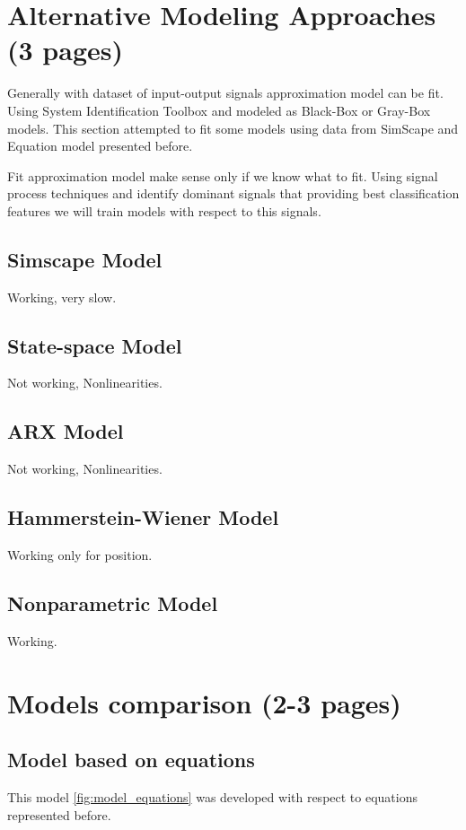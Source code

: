 \documentclass[class=article, crop=false]{standalone}
\begin{document}
\section{Alternative Modeling Approaches (3 pages)}
Generally with dataset of input-output signals approximation model can be
fit. Using System Identification Toolbox and modeled as Black-Box or
Gray-Box models. This section attempted to fit some models using data from
SimScape and Equation model presented before.

Fit approximation model make sense only if we know what to fit. Using
signal process techniques and identify dominant signals that providing best
classification features we will train models with respect to this signals.


\subsection{Simscape Model}
Working, very slow.


\subsection{State-space Model}
Not working, Nonlinearities.

\subsection{ARX Model}
Not working, Nonlinearities.

\subsection{Hammerstein-Wiener Model}
Working only for position.

\subsection{Nonparametric Model}
Working.


\section{Models comparison (2-3 pages)}
\subsection{Model based on equations}
This model \ref{fig:model_equations} was developed with respect to equations
represented before.
\end{document}
